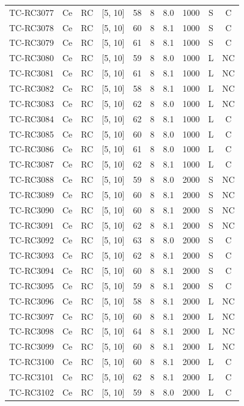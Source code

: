 \begin{longtable}{lccccccccc}
TC-RC3077 & Ce & RC & [5, 10] & 58 & 8 & 8.0 & 1000 & S & C \\
TC-RC3078 & Ce & RC & [5, 10] & 60 & 8 & 8.1 & 1000 & S & C \\
TC-RC3079 & Ce & RC & [5, 10] & 61 & 8 & 8.1 & 1000 & S & C \\
TC-RC3080 & Ce & RC & [5, 10] & 59 & 8 & 8.0 & 1000 & L & NC \\
TC-RC3081 & Ce & RC & [5, 10] & 61 & 8 & 8.1 & 1000 & L & NC \\
TC-RC3082 & Ce & RC & [5, 10] & 58 & 8 & 8.1 & 1000 & L & NC \\
TC-RC3083 & Ce & RC & [5, 10] & 62 & 8 & 8.0 & 1000 & L & NC \\
TC-RC3084 & Ce & RC & [5, 10] & 62 & 8 & 8.1 & 1000 & L & C \\
TC-RC3085 & Ce & RC & [5, 10] & 60 & 8 & 8.0 & 1000 & L & C \\
TC-RC3086 & Ce & RC & [5, 10] & 61 & 8 & 8.0 & 1000 & L & C \\
TC-RC3087 & Ce & RC & [5, 10] & 62 & 8 & 8.1 & 1000 & L & C \\
TC-RC3088 & Ce & RC & [5, 10] & 59 & 8 & 8.0 & 2000 & S & NC \\
TC-RC3089 & Ce & RC & [5, 10] & 60 & 8 & 8.1 & 2000 & S & NC \\
TC-RC3090 & Ce & RC & [5, 10] & 60 & 8 & 8.1 & 2000 & S & NC \\
TC-RC3091 & Ce & RC & [5, 10] & 62 & 8 & 8.1 & 2000 & S & NC \\
TC-RC3092 & Ce & RC & [5, 10] & 63 & 8 & 8.0 & 2000 & S & C \\
TC-RC3093 & Ce & RC & [5, 10] & 62 & 8 & 8.1 & 2000 & S & C \\
TC-RC3094 & Ce & RC & [5, 10] & 60 & 8 & 8.1 & 2000 & S & C \\
TC-RC3095 & Ce & RC & [5, 10] & 59 & 8 & 8.1 & 2000 & S & C \\
TC-RC3096 & Ce & RC & [5, 10] & 58 & 8 & 8.1 & 2000 & L & NC \\
TC-RC3097 & Ce & RC & [5, 10] & 60 & 8 & 8.1 & 2000 & L & NC \\
TC-RC3098 & Ce & RC & [5, 10] & 64 & 8 & 8.1 & 2000 & L & NC \\
TC-RC3099 & Ce & RC & [5, 10] & 60 & 8 & 8.1 & 2000 & L & NC \\
TC-RC3100 & Ce & RC & [5, 10] & 60 & 8 & 8.1 & 2000 & L & C \\
TC-RC3101 & Ce & RC & [5, 10] & 62 & 8 & 8.1 & 2000 & L & C \\
TC-RC3102 & Ce & RC & [5, 10] & 59 & 8 & 8.0 & 2000 & L & C \\

\end{longtable}
